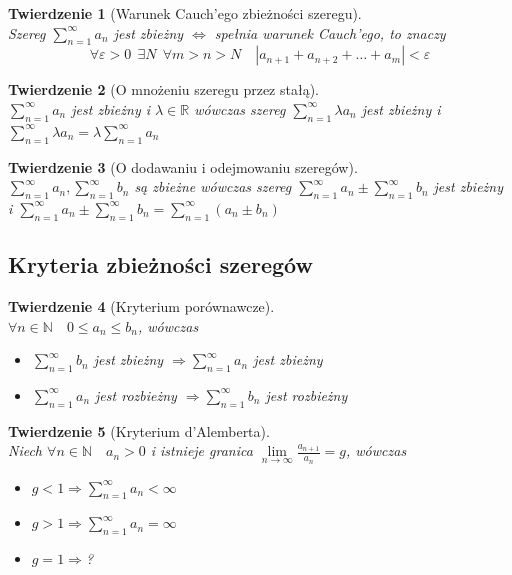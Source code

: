 \documentclass[12pt,a4paper]{article}
\newtheorem{tw}{Twierdzenie}
\theoremstyle{definition}
\begin{document}
\begin{tw}[Warunek Cauch'ego zbieżności szeregu]~\\
Szereg $\sum\limits_{n=1}^\infty a_n$ jest zbieżny $\Leftrightarrow$ spełnia warunek Cauch'ego, to znaczy
$$
\forall \varepsilon > 0 ~~\exists N ~~\forall m > n > N \quad |a_{n+1} + a_{n+2} + \dots + a_m| < \varepsilon
$$
\end{tw}

\begin{tw}[O mnożeniu szeregu przez stałą]~\\
$\sum\limits_{n=1}^\infty a_n$ jest zbieżny i $\lambda\in\mathbb{R}$ wówczas szereg $\sum\limits_{n=1}^\infty \lambda a_n$ jest zbieżny i $\sum\limits_{n=1}^\infty \lambda a_n = \lambda \sum\limits_{n=1}^\infty a_n$
\end{tw}
\begin{tw}[O dodawaniu i odejmowaniu szeregów]~\\
$\sum\limits_{n=1}^\infty a_n, \sum\limits_{n=1}^\infty b_n$ są zbieżne wówczas szereg $\sum\limits_{n=1}^\infty a_n \pm \sum\limits_{n=1}^\infty b_n$ jest zbieżny i $\sum\limits_{n=1}^\infty a_n \pm \sum\limits_{n=1}^\infty b_n = \sum\limits_{n=1}^\infty (a_n \pm b_n)$
\end{tw}

\subsection{Kryteria zbieżności szeregów}

\begin{tw}[Kryterium porównawcze]~\\
$\forall n\in\mathbb{N} \quad 0 \leqslant a_n \leqslant b_n$, wówczas
\begin{itemize}
	\item $\sum\limits_{n=1}^\infty b_n$ jest zbieżny $\Rightarrow \sum\limits_{n=1}^\infty a_n$ jest zbieżny
	\item $\sum\limits_{n=1}^\infty a_n$ jest rozbieżny $\Rightarrow \sum\limits_{n=1}^\infty b_n$ jest rozbieżny
\end{itemize}
\end{tw}

\begin{tw}[Kryterium d'Alemberta]~\\
Niech $\forall n\in\mathbb{N} \quad a_n > 0$ i istnieje granica 
$\lim\limits_{n\to\infty} \frac{a_{n+1}}{a_n} = g$, wówczas
\begin{itemize}
	\item $g < 1 \Rightarrow \sum\limits_{n=1}^\infty a_n < \infty$
	\item $g > 1 \Rightarrow \sum\limits_{n=1}^\infty a_n = \infty$
	\item $g = 1 \Rightarrow $?
\end{itemize}
\end{tw}
\end{document}
